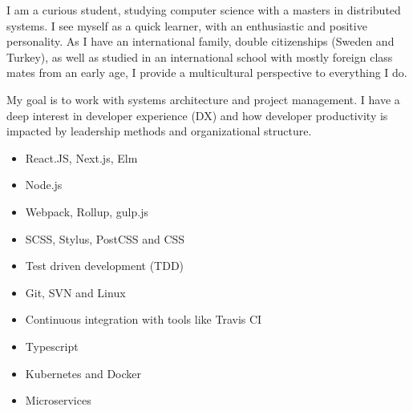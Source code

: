 I am a curious student, studying computer science with a masters in distributed systems. 
I see myself as a quick learner, with an enthusiastic and positive personality. As I have an international family, double citizenships (Sweden and Turkey), as well as studied in an international school with mostly foreign class mates from an early age, I provide a multicultural perspective to everything I do.

My goal is to work with systems architecture and project management. I have a deep interest in developer experience (DX) and how developer productivity is impacted by leadership methods and organizational structure.



\divider


\divider

\vspace{-1.5em}



\begin{itemize}
    \item React.JS, Next.js, Elm
    \item Node.js
    \item Webpack, Rollup, gulp.js
    \item SCSS, Stylus, PostCSS and CSS
\end{itemize}


\divider

\begin{itemize}
    \item Test driven development (TDD)
    \item Git, SVN and Linux
    \item Continuous integration with tools like Travis CI
    \item Typescript
    \item Kubernetes and Docker
    \item Microservices
\end{itemize}





